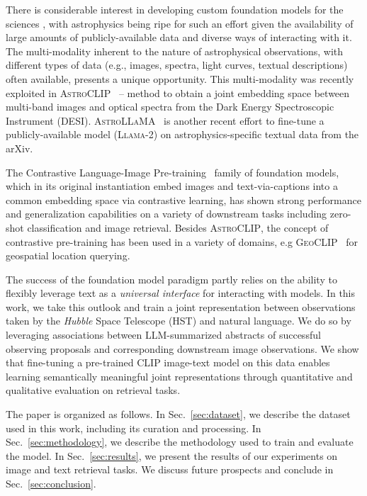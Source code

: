 \documentclass[10pt]{article} %
\newcommand{\hubble}{\emph{Hubble}\xspace}
\begin{document}
There is considerable interest in developing custom foundation models for the sciences \citep{batatia2023foundation,subramanian2023towards}, with astrophysics being ripe for such an effort given the availability of large amounts of publicly-available data and diverse ways of interacting with it. The multi-modality inherent to the nature of astrophysical observations, with different types of data (e.g., images, spectra, light curves, textual descriptions) often available, presents a unique opportunity. This multi-modality was recently exploited in \textsc{AstroCLIP}~\citep{lanusse2023astroclip} -- method to obtain a joint embedding space between multi-band images and optical spectra from the Dark Energy Spectroscopic Instrument (DESI). \textsc{AstroLLaMA}~\citep{nguyen2023astrollama} is another recent effort to fine-tune a publicly-available model (\textsc{Llama-2}) on astrophysics-specific textual data from the arXiv.

The Contrastive Language-Image Pre-training~\citep[CLIP;][]{radford2021learning} family of foundation models, which in its original instantiation embed images and text-via-captions into a common embedding space via contrastive learning, has shown strong performance and generalization capabilities on a variety of downstream tasks including zero-shot classification and image retrieval. Besides \textsc{AstroCLIP}, the concept of contrastive pre-training has been used in a variety of domains, e.g \textsc{GeoCLIP}~\citep{cepeda2023geoclip} for geospatial location querying.

The success of the foundation model paradigm partly relies on the ability to flexibly leverage text as a \emph{universal interface} for interacting with models. In this work, we take this outlook and train a joint representation between observations taken by the \hubble Space Telescope (HST) and natural language. We do so by leveraging associations between LLM-summarized abstracts of successful observing proposals and corresponding downstream image observations. We show that fine-tuning a pre-trained CLIP image-text model on this data enables learning semantically meaningful joint representations through quantitative and qualitative evaluation on retrieval tasks.

The paper is organized as follows. In Sec.~\ref{sec:dataset}, we describe the dataset used in this work, including its curation and processing. In Sec.~\ref{sec:methodology}, we describe the methodology used to train and evaluate the model. In Sec.~\ref{sec:results}, we present the results of our experiments on image and text retrieval tasks. We discuss future prospects and conclude in Sec.~\ref{sec:conclusion}.
\end{document}
